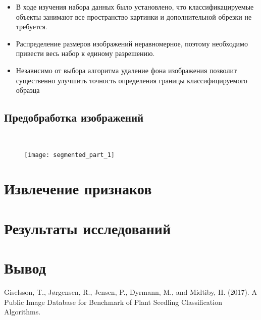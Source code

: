 \documentclass[12pt]{article}
\begin{document}
\begin{itemize}
	\item В ходе изучения набора данных было установлено, что классификацируемые объекты занимают все пространство картинки и дополнительной обрезки не требуется. 
	\item Распределение размеров изображений неравномерное, поэтому необходимо привести весь набор к единому разрешению. 
	\item Независимо от выбора алгоритма удаление фона изображения позволит существенно улучшить точность определения границы классифицируемого образца
\end{itemize}

\subsection{Предобработка изображений}
\\
\begin{figure}[h]
	\centering
	\texttt{[image: segmented\_part\_1]}
\end{figure}


\section{Извлечение признаков}

\section{Результаты исследований}

\section{Вывод}

\newpage

\begin{thebibliography}{}
	 Giselsson, T., Jørgensen, R., Jensen, P., Dyrmann, M., and Midtiby, H. (2017). A Public Image Database for Benchmark of Plant Seedling Classification Algorithms. 
\end{thebibliography}
\end{document}
